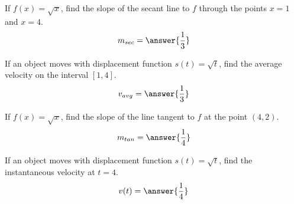\documentclass{ximera}
\author{Bobby Ramsey}
\begin{document}
\begin{exercise}
	
	If $f(x) = \sqrt{x}$,
	find the slope of the secant line to $f$ through the points $x=1$ and $x=4$.
	\[ m_{sec} = \answer{\frac{1}{3}} \]

	\begin{exercise}
		If an object moves with displacement function 
		$s(t) = \sqrt{t}$, find the average velocity on the interval $[1,4]$.
		\[ v_{avg} = \answer{\frac{1}{3}} \]
	\end{exercise}

\end{exercise}

\begin{exercise}
	If $f(x) = \sqrt{x}$, find the slope of the line tangent to $f$ at the point $(4,2)$.
	\[ m_{tan} = \answer{\frac{1}{4}} \]
	\begin{exercise}
		If an object moves with displacement function $s(t) = \sqrt{t}$,
		find the instantaneous velocity at $t=4$.
		\[ v(t) = \answer{\frac{1}{4}} \]
	\end{exercise} 

\end{exercise}
\end{document}
